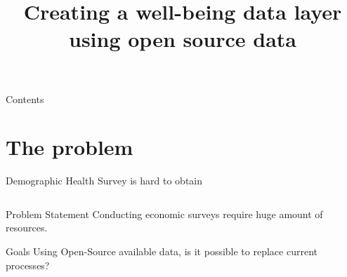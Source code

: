 \documentclass[t]{beamer}
\title{Creating a well-being data layer using open source data}
\begin{document}
\begin{frame}
	\titlepage
\end{frame}



\begin{frame}{Contents}
	\tableofcontents
\end{frame}

\section{The problem}

\begin{frame}{Demographic Health Survey is hard to obtain}
	\begin{columns}[T,totalwidth=\textwidth]
        \begin{column}{0.45\textwidth}
	        \begin{block}{Problem Statement}
	            Conducting economic surveys require huge amount of resources.
	        \end{block}
	    
	        \begin{block}{Goals}
	            Using Open-Source available data, is it possible to replace current processes?
	        \end{block}
	    \end{column}
	    

\end{columns}
\end{frame}
\end{document}
